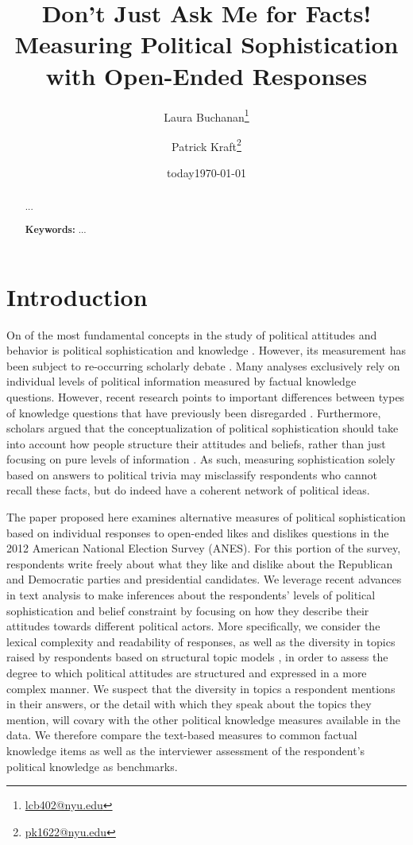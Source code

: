 \documentclass[12pt]{article}
\author{Laura Buchanan\footnote{\href{mailto:lcb402@nyu.edu}{lcb402@nyu.edu}} \and Patrick Kraft\footnote{\href{mailto:pk1622@nyu.edu}{pk1622@nyu.edu}}}
\date{today}
\title{Don't Just Ask Me for Facts!\\
\large{Measuring Political Sophistication with Open-Ended Responses}}
\date{\today}
\begin{document}
\maketitle
\doublespacing
\begin{abstract}
...

\vspace{\baselineskip}
\noindent \textbf{Keywords:} ...
\end{abstract}
\newpage


\section{Introduction}

On of the most fundamental concepts in the study of political attitudes and behavior is political sophistication and knowledge \citep{converse1964nature,carpini1996americans}. However, its measurement has been subject to re-occurring scholarly debate \citep[e.g.][]{mondak2000reconsidering,mondak2001asked,debell2013harder}. Many analyses exclusively rely on individual levels of political information measured by factual knowledge questions. However, recent research points to important differences between types of knowledge questions that have previously been disregarded \citep{barabas2014question}. Furthermore, scholars argued that the conceptualization of political sophistication should take into account how people structure their attitudes and beliefs, rather than just focusing on pure levels of information \citep[e.g.][]{luskin1987measuring}. As such, measuring sophistication solely based on answers to political trivia may misclassify respondents who cannot recall these facts, but do indeed have a coherent network of political ideas.

The paper proposed here examines alternative measures of political sophistication based on individual responses to open-ended likes and dislikes questions in the 2012 American National Election Survey (ANES). For this portion of the survey, respondents write freely about what they like and dislike about the Republican and Democratic parties and presidential candidates. We leverage recent advances in text analysis to make inferences about the respondents' levels of political sophistication and belief constraint by focusing on how they describe their attitudes towards different political actors. More specifically, we consider the lexical complexity and readability of responses, as well as the diversity in topics raised by respondents based on structural topic models \citep{roberts2014structural}, in order to assess the degree to which political attitudes are structured and expressed in a more complex manner. We suspect that the diversity in topics a respondent mentions in their answers, or the detail with which they speak about the topics they mention, will covary with the other political knowledge measures available in the data. We therefore compare the text-based measures to common factual knowledge items as well as the interviewer assessment of the respondent's political knowledge as benchmarks.
\end{document}
